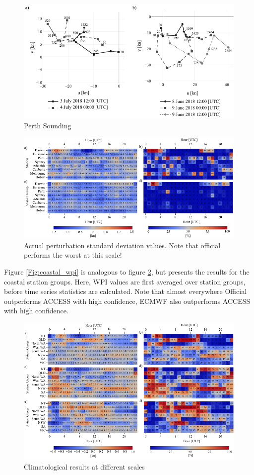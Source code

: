 \documentclass[alpha-refs]{wiley-article}
\begin{document}
\begin{figure}
\centering
\includegraphics{perth_sounding.pdf}
\caption{Perth Sounding}
\label{Fig:perth_sounding}
\end{figure}

\begin{figure}
\centering
\includegraphics{airport_wpi.pdf}
\caption{Actual perturbation standard deviation values. Note that official performs the worst at this scale!}
\label{Fig:airport_wpi}
\end{figure}

Figure \ref{Fig:coastal_wpi} is analogous to figure \ref{Fig:airport_wpi}, but presents the results for the coastal station groups. Here, WPI values are first averaged over station groups, before time series statistics are calculated. Note that almost everywhere Official outperforms ACCESS with high confidence, ECMWF also outperforms ACCESS with high confidence. 

\begin{figure}
\centering
\includegraphics{cwpi_coastal.pdf}
\caption{Climatological results at different scales}
\label{Fig:time_series_and_hodo}
\end{figure}
\end{document}
